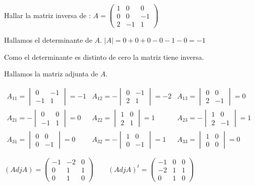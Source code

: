 \begin{ejemplo}
Hallar la matriz inversa de :
$A=\begin{pmatrix}
1 & 0 & 0 \\
0 & 0 & -1 \\
2 & -1 & 1
\end{pmatrix} $

\tcblower
Hallamos el determinante de $A$. $|A|=0+0+0-0-1-0=-1 $

Como el determinante es distinto de cero la matriz tiene inversa.

Hallamos la matriz adjunta de $A$.

$\begin{matrix}
A_ {11}=\begin{vmatrix}
0 & -1 \\
-1 & 1
\end{vmatrix}=-1 &  A_ {12}=-\begin{vmatrix}
0 & -1 \\
2 & 1
\end{vmatrix}=-2 & A_ {13}=\begin{vmatrix}
0 & 0 \\
2 & -1
\end{vmatrix}=0 \\
A_ {21}=-\begin{vmatrix}
0 & 0 \\
-1 & 1
\end{vmatrix}=0 & A_ {22}=\begin{vmatrix}
1 & 0 \\
2 & 1
\end{vmatrix}=1 & A_ {23}=-\begin{vmatrix}
1 & 0 \\
2 & -1
\end{vmatrix}=1 \\
A_ {31}=\begin{vmatrix}
0 & 0 \\
0 & -1
\end{vmatrix}=0 & A_ {32}=-\begin{vmatrix}
1 & 0 \\
0 & -1
\end{vmatrix}=1 & A_ {33}=\begin{vmatrix}
1 & 0 \\
0 & 0
\end{vmatrix}=0
\end{matrix} $

$(Adj A)= \begin{pmatrix}
-1 & -2 & 0 \\
0 & 1 & 1 \\
0 & 1 & 0
\end{pmatrix} \qquad \left( Adj A \right)^t=\begin{pmatrix}
-1 & 0 & 0 \\
-2 & 1 & 1 \\
0 & 1 & 0
\end{pmatrix}  $


\end{ejemplo}
